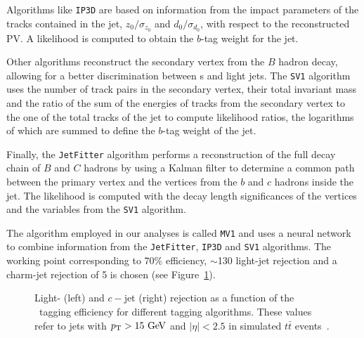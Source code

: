 Algorithms like \texttt{IP3D} are
based on information from the impact parameters of the tracks
contained in the jet, $z_0/\sigma_{z_0}$ and $d_0/\sigma_{d_0}$,
with respect to the reconstructed PV. 
A likelihood is computed to
obtain the $b$-tag weight for the jet.

Other algorithms reconstruct the secondary vertex from the $B$ hadron
decay, allowing for a better discrimination between \bjet s and light
jets. The \texttt{SV1} algorithm uses the number of track pairs in
the secondary vertex, their total invariant mass and the ratio of
the sum of the energies of tracks from the secondary vertex to the one
of the total tracks of the jet to compute likelihood ratios, the logarithms
of which are summed to define the $b$-tag weight of the jet.

Finally, the \texttt{JetFitter} algorithm performs a reconstruction
of the full decay chain of $B$ and $C$ hadrons by using a Kalman filter to determine a 
common path between the primary vertex and the vertices from the $b$ and $c$ hadrons 
inside the jet. The likelihood is computed with the decay length significances
of the vertices and the variables from the  \texttt{SV1} algorithm.

The algorithm employed in our analyses is called \texttt{MV1} and uses
a neural network to combine information from the \texttt{JetFitter}, \texttt{IP3D}
and \texttt{SV1} algorithms.
The working point corresponding to 70\% efficiency, 
$\sim$130 light-jet rejection and a charm-jet rejection of 5 is 
chosen (see Figure~\ref{fig:btageffs}).

\begin{figure}[tb]\begin{center}
	\caption{Light- (left) and $c-$jet (right) rejection as a function of the \bjet\ tagging efficiency
        for different tagging algorithms. These values refer to jets with $\pt >15\gev$ and 
$|\eta|<2.5$ in simulated $t\bar{t}$ events~\cite{btagging}.\label{fig:btageffs}}
\end{center}\end{figure}

